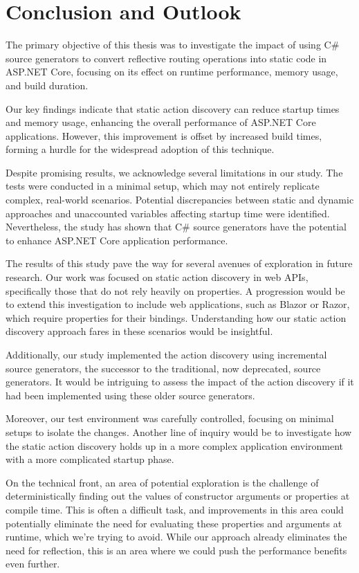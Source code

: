 \chapter{Conclusion and Outlook}

The primary objective of this thesis was to investigate the impact of using C\# source generators to convert reflective routing operations into static code in ASP.NET Core, focusing on its effect on runtime performance, memory usage, and build duration.

Our key findings indicate that static action discovery can reduce startup times and memory usage, enhancing the overall performance of ASP.NET Core applications. However, this improvement is offset by increased build times, forming a hurdle for the widespread adoption of this technique.

Despite promising results, we acknowledge several limitations in our study. The tests were conducted in a minimal setup, which may not entirely replicate complex, real-world scenarios. Potential discrepancies between static and dynamic approaches and unaccounted variables affecting startup time were identified. Nevertheless, the study has shown that C\# source generators have the potential to enhance ASP.NET Core application performance.

The results of this study pave the way for several avenues of exploration in future research. Our work was focused on static action discovery in web APIs, specifically those that do not rely heavily on properties. A progression would be to extend this investigation to include web applications, such as Blazor or Razor, which require properties for their bindings. Understanding how our static action discovery approach fares in these scenarios would be insightful.

Additionally, our study implemented the action discovery using incremental source generators, the successor to the traditional, now deprecated, source generators. It would be intriguing to assess the impact of the action discovery if it had been implemented using these older source generators.

Moreover, our test environment was carefully controlled, focusing on minimal setups to isolate the changes. Another line of inquiry would be to investigate how the static action discovery holds up in a more complex application environment with a more complicated startup phase.

On the technical front, an area of potential exploration is the challenge of deterministically finding out the values of constructor arguments or properties at compile time. This is often a difficult task, and improvements in this area could potentially eliminate the need for evaluating these properties and arguments at runtime, which we're trying to avoid. While our approach already eliminates the need for reflection, this is an area where we could push the performance benefits even further.

